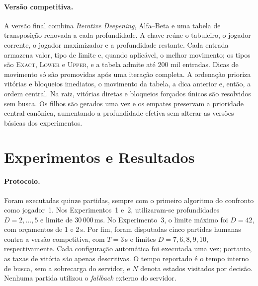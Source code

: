 \documentclass[letterpaper]{article} %
\begin{document}
\paragraph{Versão competitiva.}
A versão final combina \textit{Iterative Deepening}, Alfa--Beta e uma tabela de transposição renovada a cada profundidade. A chave reúne o tabuleiro, o jogador corrente, o jogador maximizador e a profundidade restante. Cada entrada armazena valor, tipo de limite e, quando aplicável, o melhor movimento; os tipos são \textsc{Exact}, \textsc{Lower} e \textsc{Upper}, e a tabela admite até 200 mil entradas. Dicas de movimento só são promovidas após uma iteração completa. A ordenação prioriza vitórias e bloqueios imediatos, o movimento da tabela, a dica anterior e, então, a ordem central. Na raiz, vitórias diretas e bloqueios forçados únicos são resolvidos sem busca. Os filhos são gerados uma vez e os empates preservam a prioridade central canônica, aumentando a profundidade efetiva sem alterar as versões básicas dos experimentos.

\section{Experimentos e Resultados}

\paragraph{Protocolo.}
Foram executadas quinze partidas, sempre com o primeiro algoritmo do confronto como jogador~1. Nos Experimentos~1 e~2, utilizaram-se profundidades $D=2,\ldots,5$ e limite de $30\,000$\,ms. No Experimento~3, o limite máximo foi $D=42$, com orçamentos de 1 e 2\,s. Por fim, foram disputadas cinco partidas humanas contra a versão competitiva, com $T=3$\,s e limites $D=7,6,8,9,10$, respectivamente. Cada configuração automática foi executada uma vez; portanto, as taxas de vitória são apenas descritivas. O tempo reportado é o tempo interno de busca, sem a sobrecarga do servidor, e $N$ denota estados visitados por decisão. Nenhuma partida utilizou o \textit{fallback} externo do servidor.
\end{document}
